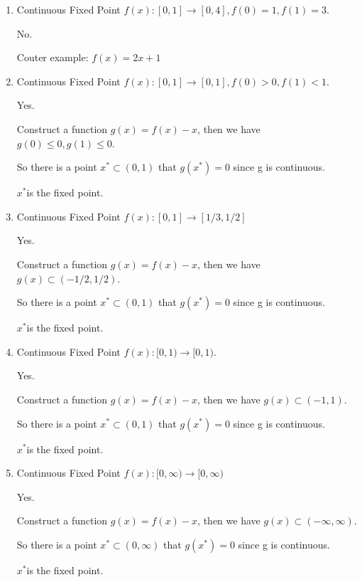 \documentclass{article}
\newenvironment{answer}{\par\color{ForestGreen}}{\par}
\begin{document}
\begin{enumerate}
    \item
    Continuous Fixed Point $f (x) : [0, 1] \rightarrow [0, 4], f (0) = 1, f(1) = 3.$

    \begin{answer}
      No.

      Couter example: $f(x) = 2x+1$
    \end{answer}

    \item
    Continuous Fixed Point $f (x) : [0, 1] \rightarrow [0, 1], f (0) > 0, f(1) < 1.$

    \begin{answer}
      Yes.

      Construct a function $g(x) = f(x) - x$, then we have $g(0)\le0, g(1)\le0$.

      So there is a point $x^* \subset (0,1)$ that $g(x^*) = 0$ since g is continuous.

      $x^* $is the fixed point.
    \end{answer}

    \item
    Continuous Fixed Point $f (x ) : [0, 1] \rightarrow [1/3, 1/2]$

    \begin{answer}
      Yes.

      Construct a function $g(x) = f(x) - x$, then we have $g(x) \subset (-1/2, 1/2) $.

      So there is a point $x^* \subset (0,1)$ that $g(x^*) = 0$ since g is continuous.

      $x^* $is the fixed point.
    \end{answer}

    \item
    Continuous Fixed Point $f (x ) : [0, 1) \rightarrow  [0, 1).$

    \begin{answer}
      Yes.

      Construct a function $g(x) = f(x) - x$, then we have $g(x) \subset (-1, 1) $.

      So there is a point $x^* \subset (0,1)$ that $g(x^*) = 0$ since g is continuous.

      $x^* $is the fixed point.
    \end{answer}

    \item
    Continuous Fixed Point $f (x ) : [0, \infty) \rightarrow  [0, \infty)$

    \begin{answer}
      Yes.

      Construct a function $g(x) = f(x) - x$, then we have $g(x) \subset (-\infty, \infty) $.

      So there is a point $x^* \subset (0,\infty)$ that $g(x^*) = 0$ since g is continuous.

      $x^* $is the fixed point.
    \end{answer}
\end{enumerate}
\end{document}
